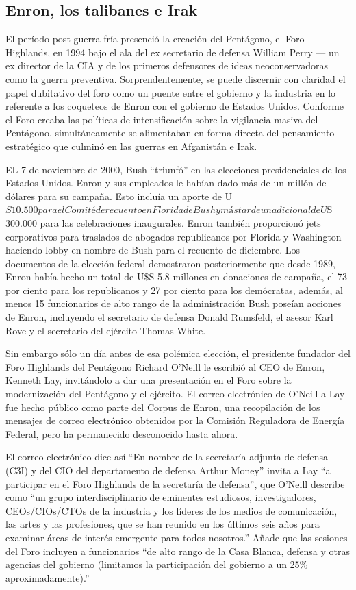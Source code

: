 \documentclass[10pt,a5paper,twoside,spanish,]{book}
\begin{document}
\subsection{Enron, los talibanes e
Irak}\label{enron-los-talibanes-e-irak}

El período post-guerra fría presenció la creación del Pentágono, el Foro
Highlands, en 1994 bajo el ala del ex secretario de defensa William
Perry --- un ex director de la CIA y de los primeros defensores de ideas
neoconservadoras como la guerra preventiva. Sorprendentemente, se puede
discernir con claridad el papel dubitativo del foro como un puente entre
el gobierno y la industria en lo referente a los coqueteos de Enron con
el gobierno de Estados Unidos. Conforme el Foro creaba las políticas de
intensificación sobre la vigilancia masiva del Pentágono,
simultáneamente se alimentaban en forma directa del pensamiento
estratégico que culminó en las guerras en Afganistán e Irak.

EL 7 de noviembre de 2000, Bush ``triunfó'' en las elecciones
presidenciales de los Estados Unidos. Enron y sus empleados le habían
dado más de un millón de dólares para su campaña. Esto incluía un aporte
de
U\(S 10.500 para el Comité de recuento en Florida de Bush y más tarde un adicional de U\)S
300.000 para las celebraciones inaugurales. Enron también proporcionó
jets corporativos para traslados de abogados republicanos por Florida y
Washington haciendo lobby en nombre de Bush para el recuento de
diciembre. Los documentos de la elección federal demostraron
posteriormente que desde 1989, Enron había hecho un total de U\$S 5,8
millones en donaciones de campaña, el 73 por ciento para los
republicanos y 27 por ciento para los demócratas, además, al menos 15
funcionarios de alto rango de la administración Bush poseían acciones de
Enron, incluyendo el secretario de defensa Donald Rumsfeld, el asesor
Karl Rove y el secretario del ejército Thomas White.

Sin embargo sólo un día antes de esa polémica elección, el presidente
fundador del Foro Highlands del Pentágono Richard O'Neill le escribió al
CEO de Enron, Kenneth Lay, invitándolo a dar una presentación en el Foro
sobre la modernización del Pentágono y el ejército. El correo
electrónico de O'Neill a Lay fue hecho público como parte del Corpus de
Enron, una recopilación de los mensajes de correo electrónico obtenidos
por la Comisión Reguladora de Energía Federal, pero ha permanecido
desconocido hasta ahora.

El correo electrónico dice así ``En nombre de la secretaría adjunta de
defensa (C3I) y del CIO del departamento de defensa Arthur Money''
invita a Lay ``a participar en el Foro Highlands de la secretaría de
defensa'', que O'Neill describe como ``un grupo interdisciplinario de
eminentes estudiosos, investigadores, CEOs/CIOs/CTOs de la industria y
los líderes de los medios de comunicación, las artes y las profesiones,
que se han reunido en los últimos seis años para examinar áreas de
interés emergente para todos nosotros.'' Añade que las sesiones del Foro
incluyen a funcionarios ``de alto rango de la Casa Blanca, defensa y
otras agencias del gobierno (limitamos la participación del gobierno a
un 25\% aproximadamente).''
\end{document}
